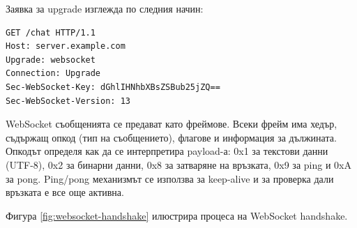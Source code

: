 Заявка за upgrade изглежда по следния начин:
\begin{verbatim}
GET /chat HTTP/1.1
Host: server.example.com
Upgrade: websocket
Connection: Upgrade
Sec-WebSocket-Key: dGhlIHNhbXBsZSBub25jZQ==
Sec-WebSocket-Version: 13
\end{verbatim}

WebSocket съобщенията се предават като фреймове. Всеки фрейм има хедър, съдържащ опкод (тип на съобщението), флагове и информация за дължината. Опкодът определя как да се интерпретира payload-а: 0x1 за текстови данни (UTF-8), 0x2 за бинарни данни, 0x8 за затваряне на връзката, 0x9 за ping и 0xA за pong. Ping/pong механизмът се използва за keep-alive и за проверка дали връзката е все още активна.

Фигура \ref{fig:websocket-handshake} илюстрира процеса на WebSocket handshake.

